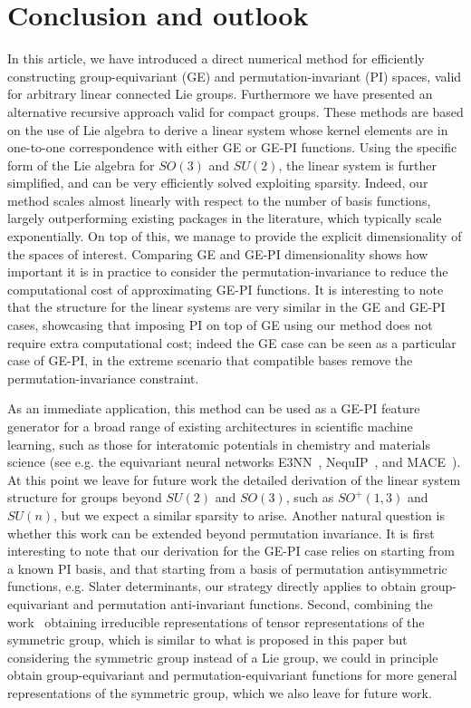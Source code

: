 \documentclass{article}
\numberwithin{equation}{section}
\begin{document}
\section{Conclusion and outlook}
\label{sec:conclusion}

In this article, we have introduced a direct numerical method for efficiently constructing group-equivariant (GE) and permutation-invariant (PI) spaces, valid for arbitrary linear connected Lie groups. Furthermore we have presented an alternative recursive approach valid for compact groups. These methods are based on the use of Lie algebra to derive a linear system whose kernel elements are in one-to-one correspondence with either GE or GE-PI functions. Using the specific form of the Lie algebra for $SO(3)$ and $SU(2)$, the linear system is further simplified, and can be very efficiently solved exploiting sparsity.
Indeed, our method scales almost  linearly with respect to the number of basis functions, largely outperforming existing packages in the literature, which typically scale exponentially. 
On top of this, we manage to provide the explicit dimensionality of the spaces of interest. 
Comparing GE and GE-PI dimensionality shows how important it is in practice to consider the permutation-invariance to reduce the computational cost of approximating GE-PI functions.
It is interesting to note that the structure for the linear systems are very similar in the GE and GE-PI cases, showcasing that imposing PI on top of GE using our method does not require extra computational cost; indeed the GE case can be seen as a particular case of GE-PI, in the extreme scenario that compatible bases remove the permutation-invariance constraint. 

As an immediate application, this method can be used
as a GE-PI feature generator for a broad range of existing architectures in scientific machine learning, such as those for interatomic potentials in chemistry and materials science (see e.g. the equivariant neural networks E3NN~\cite{geiger2022e3nn}, NequIP~\cite{Batzner2022-az}, and MACE~\cite{Batatia2022-zi}). 
At this point we leave for future work the detailed derivation of the linear system structure for groups beyond $SU(2)$ and $SO(3)$, such as $SO^+(1,3)$ and $SU(n)$, but we expect a similar sparsity to arise.
Another natural question is whether this work can be extended beyond permutation invariance.
It is first interesting to note that our derivation for the GE-PI case relies on starting from a known PI basis, and that starting from a basis of permutation antisymmetric functions, e.g. Slater determinants, our strategy directly applies to obtain group-equivariant and permutation anti-invariant functions.
Second, combining the work~\cite{Olver2026-tt} obtaining irreducible representations of tensor representations of the symmetric group, which is similar to what is proposed in this paper but considering the symmetric group instead of a Lie group, 
we could in principle obtain group-equivariant and permutation-equivariant functions for more general representations of the symmetric group, which we also leave for future work.
\end{document}
